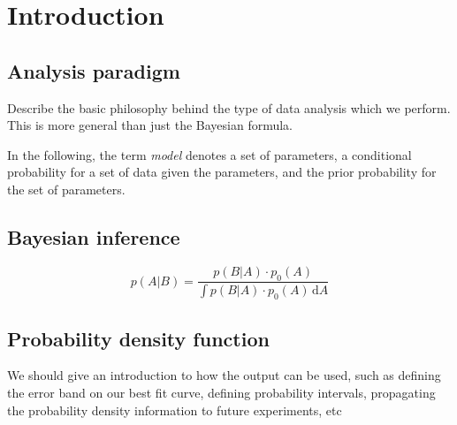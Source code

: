\documentclass[11pt, a4paper]{article}
\begin{document}
\thispagestyle{empty} 

\tableofcontents

\pagebreak 


\section{Introduction}


\subsection{Analysis paradigm} 

Describe the basic philosophy behind the type of data analysis which
we perform. This is more general than just the Bayesian formula.

In the following, the term {\it model} denotes a set of parameters, a
conditional probability for a set of data given the parameters, and
the prior probability for the set of parameters.


\subsection{Bayesian inference} 

\begin{equation}
p(A|B) = \frac{p(B|A) \cdot p_{0}(A)}{\int p(B|A) \cdot p_{0}(A) \, \mathrm{d}A }
\label{eqn:BayesTheorem}
\end{equation}


\subsection{Probability density function} 

We should give an introduction to how the output can be used, such as
defining the error band on our best fit curve, defining probability
intervals, propagating the probability density information to future
experiments, etc

\end{document}
